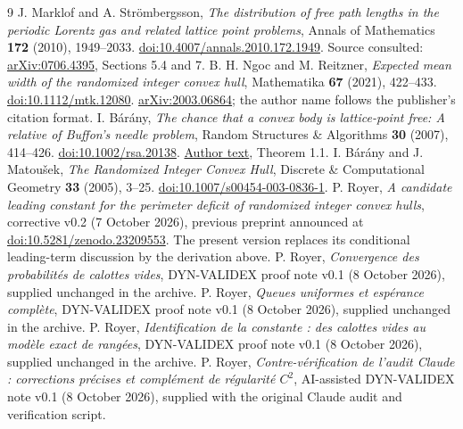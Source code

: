 \documentclass[11pt,a4paper]{article}
\theoremstyle{remark}\newtheorem{remark}{Remark}
\numberwithin{equation}{section}
\begin{document}
\begin{thebibliography}{9}
 J. Marklof and A. Strömbergsson, \emph{The distribution of free path lengths in the periodic Lorentz gas and related lattice point problems}, Annals of Mathematics \textbf{172} (2010), 1949--2033. \href{https://doi.org/10.4007/annals.2010.172.1949}{doi:10.4007/annals.2010.172.1949}. Source consulted: \href{https://arxiv.org/pdf/0706.4395}{arXiv:0706.4395}, Sections 5.4 and 7.
 B. H. Ngoc and M. Reitzner, \emph{Expected mean width of the randomized integer convex hull}, Mathematika \textbf{67} (2021), 422--433. \href{https://doi.org/10.1112/mtk.12080}{doi:10.1112/mtk.12080}. \href{https://arxiv.org/abs/2003.06864}{arXiv:2003.06864}; the author name follows the publisher's citation format.
 I. Bárány, \emph{The chance that a convex body is lattice-point free: A relative of Buffon's needle problem}, Random Structures \& Algorithms \textbf{30} (2007), 414--426. \href{https://doi.org/10.1002/rsa.20138}{doi:10.1002/rsa.20138}. \href{https://www.renyi.hu/~barany/cikkek/106.pdf}{Author text}, Theorem 1.1.
 I. Bárány and J. Matoušek, \emph{The Randomized Integer Convex Hull}, Discrete \& Computational Geometry \textbf{33} (2005), 3--25. \href{https://doi.org/10.1007/s00454-003-0836-1}{doi:10.1007/s00454-003-0836-1}.
 P. Royer, \emph{A candidate leading constant for the perimeter deficit of randomized integer convex hulls}, corrective v0.2 (7 October 2026), previous preprint announced at \href{https://doi.org/10.5281/zenodo.23209553}{doi:10.5281/zenodo.23209553}. The present version replaces its conditional leading-term discussion by the derivation above.
 P. Royer, \emph{Convergence des probabilités de calottes vides}, DYN-VALIDEX proof note v0.1 (8 October 2026), supplied unchanged in the archive.
 P. Royer, \emph{Queues uniformes et espérance complète}, DYN-VALIDEX proof note v0.1 (8 October 2026), supplied unchanged in the archive.
 P. Royer, \emph{Identification de la constante : des calottes vides au modèle exact de rangées}, DYN-VALIDEX proof note v0.1 (8 October 2026), supplied unchanged in the archive.
 P. Royer, \emph{Contre-vérification de l'audit Claude : corrections précises et complément de régularité $C^2$}, AI-assisted DYN-VALIDEX note v0.1 (8 October 2026), supplied with the original Claude audit and verification script.
\end{thebibliography}
\end{document}
